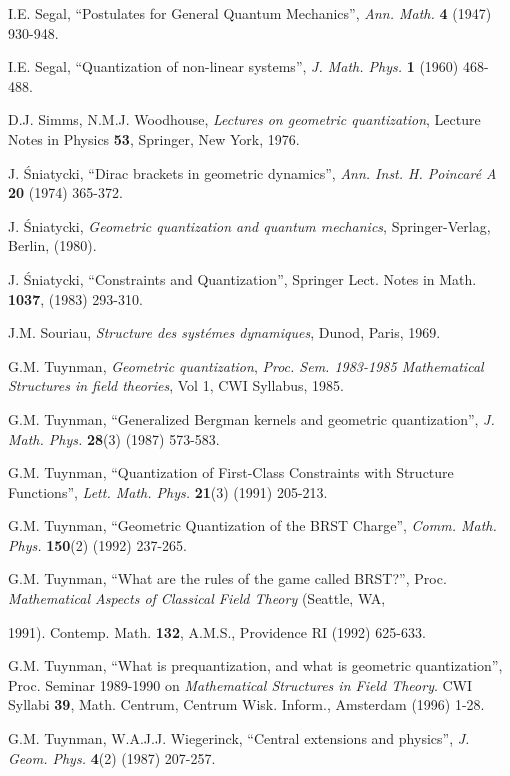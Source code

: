 \documentclass[12pt]{article}
\begin{document}
\begin{thebibliography}{55}
{\sc I.E. Segal},
``Postulates for General Quantum Mechanics'',
{\it Ann. Math.} {\bf 4} (1947) 930-948.

{\sc I.E. Segal},
``Quantization of non-linear systems'',
{\it J. Math. Phys.} {\bf 1} (1960) 468-488.

{\sc D.J. Simms, N.M.J. Woodhouse},
{\it Lectures on geometric quantization\/},
Lecture Notes in Physics {\bf 53},
Springer, New York, 1976.

{\sc J. \'Sniatycki},
``Dirac brackets in geometric dynamics'',
{\it Ann. Inst. H. Poincar\'e A} {\bf 20} (1974) 365-372.

{\sc J. \'Sniatycki},
{\it Geometric quantization and quantum mechanics\/},
Springer-Verlag, Berlin, (1980).

{\sc J. \'Sniatycki},
``Constraints and Quantization'',
Springer Lect. Notes in Math. {\bf 1037}, (1983) 293-310.

{\sc J.M. Souriau},
{\it Structure des syst\'emes dynamiques\/},
Dunod, Paris, 1969.

{\sc G.M. Tuynman},
{\it Geometric quantization},
{\it Proc. Sem. 1983-1985 Mathematical Structures in field theories},
Vol 1, CWI Syllabus, 1985.

{\sc G.M. Tuynman},
``Generalized Bergman kernels and geometric quantization'',
{\it J. Math. Phys.} {\bf 28}(3) (1987) 573-583.

{\sc G.M. Tuynman},
``Quantization of First-Class Constraints with Structure Functions'',
{\it Lett. Math. Phys.} {\bf 21}(3) (1991) 205-213.

{\sc G.M. Tuynman},
``Geometric Quantization of the BRST Charge'',
{\it Comm. Math. Phys.} {\bf 150}(2) (1992) 237-265.

{\sc G.M. Tuynman},
``What are the rules of the game called BRST?'',
Proc. {\it Mathematical Aspects of Classical Field Theory} (Seattle, WA,

1991).
Contemp. Math. {\bf 132}, A.M.S., Providence RI (1992) 625-633.

{\sc G.M. Tuynman},
``What is prequantization, and   what is geometric quantization'',
Proc. Seminar 1989-1990 on
{\it Mathematical Structures in Field Theory}.
CWI Syllabi {\bf 39}, Math. Centrum, Centrum Wisk. Inform., Amsterdam
(1996) 1-28.

{\sc G.M. Tuynman, W.A.J.J. Wiegerinck},
``Central extensions and physics'',
{\it J. Geom. Phys.} {\bf 4}(2) (1987) 207-257.


\end{thebibliography}
\end{document}
